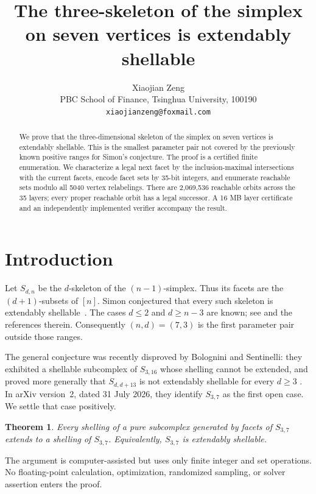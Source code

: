 \documentclass[11pt]{article}
\title{The three-skeleton of the simplex on seven vertices is extendably shellable}
\author{Xiaojian Zeng\\PBC School of Finance, Tsinghua University, 100190\\\texttt{xiaojianzeng@foxmail.com}}
\date{}
\newtheorem{theorem}{Theorem}
\begin{document}
\maketitle
\begin{abstract}
We prove that the three-dimensional skeleton of the simplex on seven vertices is extendably shellable. This is the smallest parameter pair not covered by the previously known positive ranges for Simon's conjecture. The proof is a certified finite enumeration. We characterize a legal next facet by the inclusion-maximal intersections with the current facets, encode facet sets by 35-bit integers, and enumerate reachable sets modulo all 5040 vertex relabelings. There are 2,069,536 reachable orbits across the 35 layers; every proper reachable orbit has a legal successor. A 16 MB layer certificate and an independently implemented verifier accompany the result.
\end{abstract}

\section{Introduction}
Let $S_{d,n}$ be the $d$-skeleton of the $(n-1)$-simplex. Thus its facets are the $(d+1)$-subsets of $[n]$. Simon conjectured that every such skeleton is extendably shellable~\cite[Conjecture 4.2.1]{Simon1994}. The cases $d\leq2$ and $d\geq n-3$ are known; see \cite{Bigdeli2019,Culbertson2020,Coleman2022} and the references therein. Consequently $(n,d)=(7,3)$ is the first parameter pair outside those ranges.

The general conjecture was recently disproved by Bolognini and
Sentinelli: they exhibited a shellable subcomplex of $S_{3,16}$ whose
shelling cannot be extended, and proved more generally that $S_{d,d+13}$
is not extendably shellable for every $d\geq3$
\cite[Theorem~4.2 and Remark~4.4]{BologniniSentinelli2026}.  In arXiv
version~2, dated 31 July 2026, they identify $S_{3,7}$ as the first open
case.  We settle that case positively.

\begin{theorem}\label{thm:main}
Every shelling of a pure subcomplex generated by facets of $S_{3,7}$ extends to a shelling of $S_{3,7}$. Equivalently, $S_{3,7}$ is extendably shellable.
\end{theorem}

The argument is computer-assisted but uses only finite integer and set operations. No floating-point calculation, optimization, randomized sampling, or solver assertion enters the proof.
\end{document}

